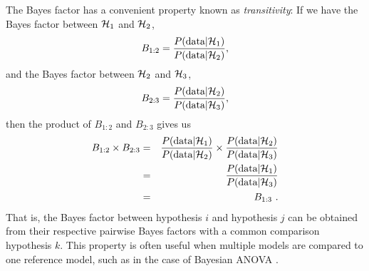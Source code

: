 \begin{tcolorbox}[title=Box~3: Transitivity of the Bayes factor,code={\singlespacing}]
The Bayes factor has a convenient property known as \textit{transitivity}:  If we have the Bayes factor between ${\mathcal{H}}_1$ and ${\mathcal{H}}_2$, $$B_{1:2}=\frac{P(\text{data}|{\mathcal{H}}_1)}{P(\text{data}|{\mathcal{H}}_2)},$$ and the Bayes factor between ${\mathcal{H}}_2$ and ${\mathcal{H}}_3$, $$B_{2:3}=\frac{P(\text{data}|{\mathcal{H}}_2)}{P(\text{data}|{\mathcal{H}}_3)},$$ then the product of $B_{1:2}$ and $B_{2:3}$ gives us 
\begin{eqnarray*}B_{1:2}\times B_{2:3}
&=& \frac{P(\text{data}|{\mathcal{H}}_1)}{P(\text{data}|{\mathcal{H}}_2)}\times\frac{P(\text{data}|{\mathcal{H}}_2)}{P(\text{data}|{\mathcal{H}}_3)}\\
&=& \frac{P(\text{data}|{\mathcal{H}}_1)}{P(\text{data}|{\mathcal{H}}_3)}\\ &=& B_{1:3}~.
\end{eqnarray*}
That is, the Bayes factor between hypothesis $i$ and hypothesis $j$ can be obtained from their respective pairwise Bayes factors with a common comparison hypothesis $k$. This property is often useful when multiple models are compared to one reference model, such as in the case of Bayesian ANOVA \cite{RouderEtAl2012ANOVA}.
\end{tcolorbox}
